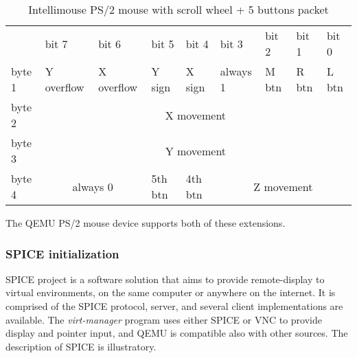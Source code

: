 \begin{table}[H]
    \begin{tabular}{lllllllll}
        & bit 7 & bit 6 & bit 5 & bit 4 & bit 3 & bit 2 & bit 1 & bit 0 \\

        \cline{2-9} 

        \multicolumn{1}{l|}{byte 1}     & \multicolumn{1}{l|}{Y overflow}   &
        \multicolumn{1}{l|}{X overflow} & \multicolumn{1}{l|}{Y sign}       &
        \multicolumn{1}{l|}{X sign}     & \multicolumn{1}{l|}{always 1}     &
        \multicolumn{1}{l|}{M btn}      & \multicolumn{1}{l|}{R btn}        &
        \multicolumn{1}{l|}{L btn} \\

        \cline{2-9} 

        \multicolumn{1}{l|}{byte 2} & \multicolumn{8}{c|}{X movement} \\

        \cline{2-9} 

        \multicolumn{1}{l|}{byte 3} & \multicolumn{8}{c|}{Y movement} \\

        \cline{2-9} 

        \multicolumn{1}{l|}{byte 4}     & \multicolumn{2}{c|}{always 0} &
        \multicolumn{1}{l|}{5th btn}    & \multicolumn{1}{l|}{4th btn}  &
        \multicolumn{4}{c|}{Z movement} \\

        \cline{2-9} 
    \end{tabular}
    \caption{Intellimouse PS/2 mouse with scroll wheel + 5 buttons packet \cite{ps2interface}}
    \label{table:imps25buttons}
\end{table}

\noindent
The QEMU PS/2 mouse device supports both of these extensions.


\subsubsection{SPICE initialization}

SPICE project is a software solution that aims to provide remote-display to
virtual environments, on the same computer or anywhere on the internet.  It is
comprised of the SPICE protocol, server, and several client implementations are
available.  The \emph{virt-manager} program uses either SPICE or VNC to provide
display and pointer input, and QEMU is compatible also with other sources.  The
description of SPICE is illustratory. %

